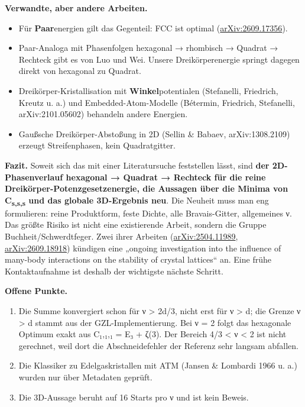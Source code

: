 \textbf{Verwandte, aber andere Arbeiten.}

\begin{itemize}
\tightlist
\item
  Für \textbf{Paar}energien gilt das Gegenteil: FCC ist optimal (\href{https://arxiv.org/abs/2609.17356}{arXiv:2609.17356}).
\item
  Paar-Analoga mit Phasenfolgen hexagonal → rhombisch → Quadrat → Rechteck gibt es von Luo und Wei. Unsere Dreikörperenergie springt dagegen direkt von hexagonal zu Quadrat.
\item
  Dreikörper-Kristallisation mit \textbf{Winkel}potentialen (Stefanelli, Friedrich, Kreutz u. a.) und Embedded-Atom-Modelle (Bétermin, Friedrich, Stefanelli, arXiv:2101.05602) behandeln andere Energien.
\item
  Gaußsche Dreikörper-Abstoßung in 2D (Sellin \& Babaev, arXiv:1308.2109) erzeugt Streifenphasen, kein Quadratgitter.
\end{itemize}

\textbf{Fazit.} Soweit sich das mit einer Literatursuche feststellen lässt, sind \textbf{der 2D-Phasenverlauf hexagonal → Quadrat → Rechteck für die reine Dreikörper-Potenzgesetzenergie, die Aussagen über die Minima von C\textsubscript{s,s,s} und das globale 3D-Ergebnis neu}. Die Neuheit muss man eng formulieren: reine Produktform, feste Dichte, alle Bravais-Gitter, allgemeines ν. Das größte Risiko ist nicht eine existierende Arbeit, sondern die Gruppe Buchheit/Schwerdtfeger. Zwei ihrer Arbeiten (\href{https://arxiv.org/abs/2504.11989}{arXiv:2504.11989}, \href{https://arxiv.org/abs/2609.18918}{arXiv:2609.18918}) kündigen eine „ongoing investigation into the influence of many-body interactions on the stability of crystal lattices`` an. Eine frühe Kontaktaufnahme ist deshalb der wichtigste nächste Schritt.

\textbf{Offene Punkte.}

\begin{enumerate}
\def\labelenumi{\arabic{enumi}.}
\tightlist
\item
  Die Summe konvergiert schon für ν \textgreater{} 2d/3, nicht erst für ν \textgreater{} d; die Grenze ν \textgreater{} d stammt aus der GZL-Implementierung. Bei ν = 2 folgt das hexagonale Optimum exakt aus C₁,₁,₁ = E₃ + ζ(3). Der Bereich 4/3 \textless{} ν \textless{} 2 ist nicht gerechnet, weil dort die Abschneidefehler der Referenz sehr langsam abfallen.
\item
  Die Klassiker zu Edelgaskristallen mit ATM (Jansen \& Lombardi 1966 u. a.) wurden nur über Metadaten geprüft.
\item
  Die 3D-Aussage beruht auf 16 Starts pro ν und ist kein Beweis.
\end{enumerate}

